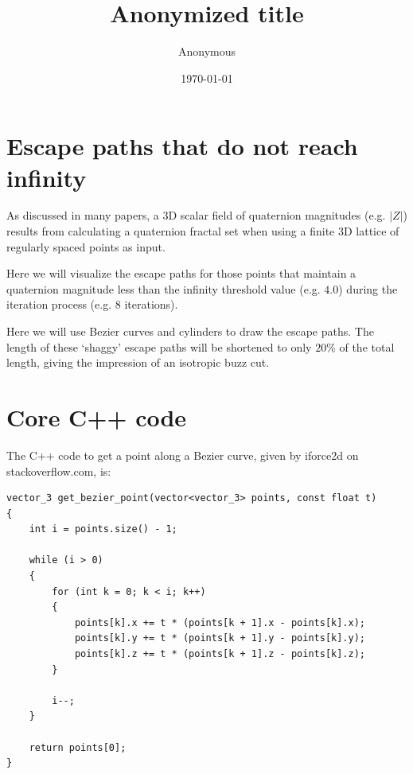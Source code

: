 \documentclass[12pt]{article}
\title{Anonymized title}
\author{Anonymous}
\date{\today}
\begin{document}


\maketitle



\section{Escape paths that do not reach infinity}

As discussed in many papers, a 3D scalar field of quaternion magnitudes (e.g. $|Z|$) results from calculating a quaternion fractal set when using a finite 3D lattice of regularly spaced points as input.

Here we will visualize the escape paths for those points that maintain a quaternion magnitude less than the infinity threshold value (e.g. $4.0$) during the iteration process (e.g. $8$ iterations).

Here we will use Bezier curves and cylinders to draw the escape paths.
The length of these `shaggy' escape paths will be shortened to only $20\%$ of the total length, giving the impression of an isotropic buzz cut.

\pagebreak

\section{Core C++ code}


The C++ code to get a point along a Bezier curve, given by iforce2d on stackoverflow.com, is:
\begin{lstlisting}
vector_3 get_bezier_point(vector<vector_3> points, const float t)
{
	int i = points.size() - 1;

	while (i > 0)
	{
		for (int k = 0; k < i; k++)
		{
			points[k].x += t * (points[k + 1].x - points[k].x);
			points[k].y += t * (points[k + 1].y - points[k].y);
			points[k].z += t * (points[k + 1].z - points[k].z);
		}

		i--;
	}

	return points[0];
}
\end{lstlisting}

\end{document}

